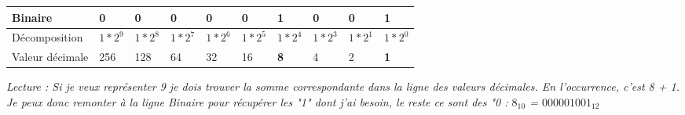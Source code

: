 
\begin{tabular}{l|l|l|l|l|l|l|l|l|l}
Binaire		&   0	&    0	&    0	&    0	&    0	&    \textbf{1}	&    0	&    0	&    \textbf{1}	\\
\hline
Décomposition	&$1*2^9$ & $1*2^8 $ &$1*2^7$ & $1*2^6$ & $1*2^5$ & \textbf{$1*2^4$} & $1*2^3$ & $1*2^1$ & $1*2^0$\\
\hline
Valeur décimale	&256	&128	&64	&32	&16	&\textbf{8}	&4	&2	&\textbf{1}\\	
\end{tabular}
\vspace{0.2cm}


\textit{Lecture : Si je veux représenter 9 je dois trouver la somme correspondante dans la ligne des valeurs décimales. En l'occurrence, c'est 8 + 1. Je peux donc remonter à la ligne Binaire pour récupérer les "1" dont j'ai besoin, le reste ce sont des "0 : $8_{\text{10}}$ = $000001001_{\text{12}}$ }
